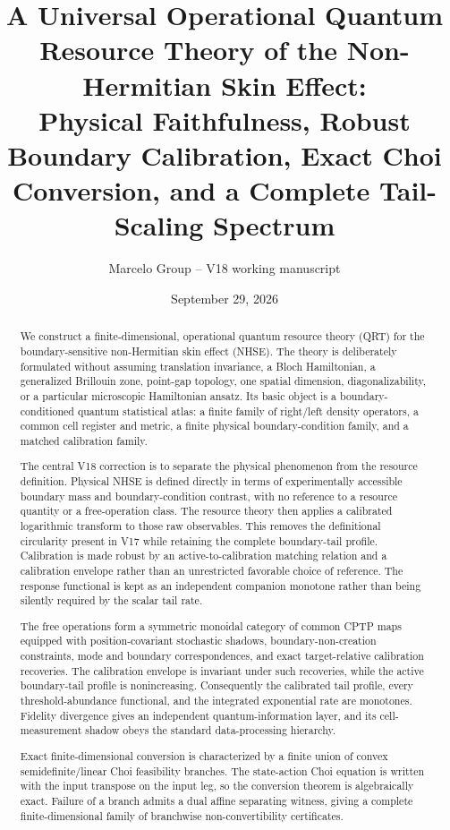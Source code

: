 \documentclass[11pt]{article}
\title{A Universal Operational Quantum Resource Theory of the Non-Hermitian Skin Effect:\\\nIndependent Physical Faithfulness, Robust Boundary Calibration, Exact Choi Conversion, and a Complete Tail-Scaling Spectrum}
\author{Marcelo Group -- V18 working manuscript}
\date{September 29, 2026}
\begin{document}
\setlength{\emergencystretch}{2em}
\maketitle

\begin{abstract}

We construct a finite-dimensional, operational quantum resource theory (QRT) for the boundary-sensitive non-Hermitian skin effect (NHSE). The theory is deliberately formulated without assuming translation invariance, a Bloch Hamiltonian, a generalized Brillouin zone, point-gap topology, one spatial dimension, diagonalizability, or a particular microscopic Hamiltonian ansatz. Its basic object is a boundary-conditioned quantum statistical atlas: a finite family of right/left density operators, a common cell register and metric, a finite physical boundary-condition family, and a matched calibration family.

The central V18 correction is to separate the physical phenomenon from the resource definition. Physical NHSE is defined directly in terms of experimentally accessible boundary mass and boundary-condition contrast, with no reference to a resource quantity or a free-operation class. The resource theory then applies a calibrated logarithmic transform to those raw observables. This removes the definitional circularity present in V17 while retaining the complete boundary-tail profile. Calibration is made robust by an active-to-calibration matching relation and a calibration envelope rather than an unrestricted favorable choice of reference. The response functional is kept as an independent companion monotone rather than being silently required by the scalar tail rate.

The free operations form a symmetric monoidal category of common CPTP maps equipped with position-covariant stochastic shadows, boundary-non-creation constraints, mode and boundary correspondences, and exact target-relative calibration recoveries. The calibration envelope is invariant under such recoveries, while the active boundary-tail profile is nonincreasing. Consequently the calibrated tail profile, every threshold-abundance functional, and the integrated exponential rate are monotones. Fidelity divergence gives an independent quantum-information layer, and its cell-measurement shadow obeys the standard data-processing hierarchy.

Exact finite-dimensional conversion is characterized by a finite union of convex semidefinite/linear Choi feasibility branches. The state-action Choi equation is written with the input transpose on the input leg, so the conversion theorem is algebraically exact. Failure of a branch admits a dual affine separating witness, giving a complete finite-dimensional family of branchwise non-convertibility certificates.


\end{abstract}
\end{document}
